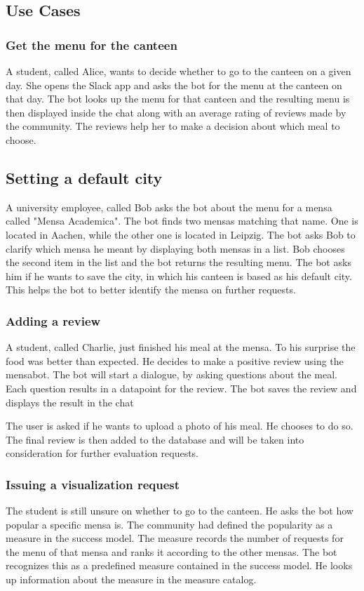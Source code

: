 \subsection{Use Cases}

\subsubsection{Get the menu for the canteen} A student, called Alice, wants to decide whether to go to the canteen on a given day. She opens the Slack app and asks the bot for the menu at the canteen on that day. The bot looks up the menu for that canteen and the resulting menu is then displayed inside the chat along with an average rating of reviews made by the community. The reviews help her to make a decision about which meal to choose.

\subsection{Setting a default city}
A university employee, called Bob asks the bot about the menu for a mensa called "Mensa Academica". The bot finds two mensas matching that name. One is located in Aachen, while the other one is located in Leipzig. 
The bot asks Bob to clarify which mensa he meant by displaying both mensas in a list. Bob chooses the second item in the list and the bot returns the resulting menu.
The bot asks him if he wants to save the city, in which his canteen is based as his default city. This helps the bot to better identify the mensa on further requests.

\subsubsection{Adding a review} A student, called Charlie, just finished his meal at the mensa. To his surprise the food was better than expected. He decides to make a positive review using the mensabot. 
The bot will start a dialogue, by asking questions about the meal. Each question results in a datapoint for the review. The bot saves the review and displays the result in the chat

The user is asked if he wants to upload a photo of his meal. He chooses to do so. The final review is then added to the database and will be taken into consideration for further evaluation requests.


\subsubsection{Issuing a visualization request}
The student is still unsure on whether to go to the canteen. He asks the bot how popular a specific mensa is. The community had defined the popularity as a measure in the success model. The measure records the number of requests for the menu of that mensa and ranks it according to the other mensas.
The bot recognizes this as a predefined measure contained in the success model. He looks up information about the measure in the measure catalog. 

